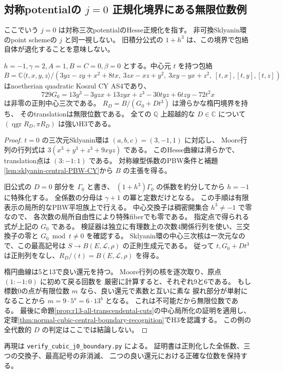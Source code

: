 \subsection{対称potentialの $j=0$ 正規化境界にある無限位数例}
\label{subsec:cubic-j0-boundary}
ここでいう $j=0$ は対称三次potentialのHesse正規化を指す。
非可換Sklyanin環のpoint schemeの $j$ と同一視しない。
旧積分公式の $1+h^3$ は、この境界で包絡自体が退化することを意味しない。

\begin{proposition}[極を除いた実際の中央切断]
\label{prop:j0-nontorsion-cut}
$h=-1,\gamma=2,A=1,B=C=0,\beta=0$ とする。中心元 $t$ を持つ包絡
\[
 B=\mathbb C\langle t,x,y,z\rangle/
 (3yz-zy+x^2+8tx,\ 3zx-xz+y^2,\ 3xy-yx+z^2,\ [t,x],[t,y],[t,z])
\]
はnoetherian quadratic Koszul CY AS4であり、
\[
 729G_0=13y^3-3yzx+13zyx+z^3-30tyz+6tzy-72t^2x
\]
は非零の正則中心三次である。
$R_D=B/(G_0+Dt^3)$ は滑らかな楕円境界を持ち、
そのtranslationは無限位数である。
全ての $\mathbb Q$ 上超越的な $D\in\mathbb C$ について
$(\operatorname{qgr}R_D,\pi R_D)$ は強いH3である。
\end{proposition}
\begin{proof}
$t=0$ の三次元Sklyanin環は $(a,b,c)=(3,-1,1)$ に対応し、
Moore行列の行列式は
$3(x^3+y^3+z^3+9xyz)$ である。
このHesse曲線は滑らかで、translation点は $(3:-1:1)$ である。
対称線型係数のPBW条件と補題\ref{lem:sklyanin-central-PBW-CY}から
$B$ の主張を得る。

旧公式の $D=0$ 部分を $\Gamma_0$ と書き、
$(1+h^3)\Gamma_0$ の係数を約分してから $h=-1$ に特殊化する。
全係数の分母は $\gamma+1$ の冪と定数だけとなる。
この手順は有限表示の局所的なPBW平坦族上で行える。
中心交換子は稠密開集合 $h^3\ne-1$ で零なので、
各次数の局所自由性により特殊fiberでも零である。
指定点で得られる式が上記の $G_0$ である。
検証器は独立に有理数上の次数4関係行列を使い、三交換子の零と
$G_0\bmod t\ne0$ を確認する。
Sklyanin環の中心三次核は一次元なので、この最高記号は
$S\to B(E,\mathcal L,\rho)$ の正則生成元である。
従って $t,G_0+Dt^3$ は正則列をなし、$R_D/(t)=B(E,\mathcal L,\rho)$ を得る。

楕円曲線は5と13で良い還元を持つ。
Moore行列の核を逐次取り、原点 $(1:-1:0)$ に初めて戻る回数を
厳密に計算すると、それぞれ9と6である。
もし標数0の点が有限位数 $m$ なら、良い還元で素数と互いに素な
捩れ部分が単射になることから $m=9\cdot5^a=6\cdot13^b$ となる。
これは不可能だから無限位数である。
最後に命題\ref{prop:r13-all-transcendental-cuts}の中心局所化の証明を適用し、
定理\ref{thm:normal-cubic-central-boundary-recognition}でH3を認識する。
この例の全代数的 $D$ の判定はここでは結論しない。
\end{proof}

再現は \texttt{verify\_cubic\_j0\_boundary.py} による。
証明書は正則化した全係数、三つの交換子、最高記号の非消滅、
二つの良い還元における正確な位数を保持する。
